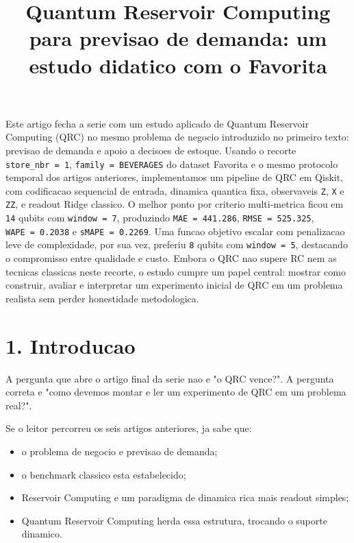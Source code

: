 \documentclass[12pt]{article}
\title{Quantum Reservoir Computing para previsao de demanda: um estudo didatico com o Favorita}
\author{}
\providecommand{\tightlist}{%
  \setlength{\itemsep}{0pt}\setlength{\parskip}{0pt}}
\begin{document}
\maketitle

\begin{resumo}
Este artigo fecha a serie com um estudo aplicado de Quantum Reservoir Computing (QRC) no mesmo problema de negocio introduzido no primeiro texto: previsao de demanda e apoio a decisoes de estoque. Usando o recorte \texttt{store\_nbr\ =\ 1}, \texttt{family\ =\ BEVERAGES} do dataset Favorita e o mesmo protocolo temporal dos artigos anteriores, implementamos um pipeline de QRC em Qiskit, com codificacao sequencial de entrada, dinamica quantica fixa, observaveis \texttt{Z}, \texttt{X} e \texttt{ZZ}, e readout Ridge classico. O melhor ponto por criterio multi-metrica ficou em \texttt{14} qubits com \texttt{window\ =\ 7}, produzindo \texttt{MAE\ =\ 441.286}, \texttt{RMSE\ =\ 525.325}, \texttt{WAPE\ =\ 0.2038} e \texttt{sMAPE\ =\ 0.2269}. Uma funcao objetivo escalar com penalizacao leve de complexidade, por sua vez, preferiu \texttt{8} qubits com \texttt{window\ =\ 5}, destacando o compromisso entre qualidade e custo. Embora o QRC nao supere RC nem as tecnicas classicas neste recorte, o estudo cumpre um papel central: mostrar como construir, avaliar e interpretar um experimento inicial de QRC em um problema realista sem perder honestidade metodologica.
\end{resumo}

\section{1. Introducao}\label{1-introducao}

A pergunta que abre o artigo final da serie nao e "o QRC vence?". A pergunta correta e "como devemos montar e ler um experimento de QRC em um problema real?".

Se o leitor percorreu os seis artigos anteriores, ja sabe que:

\begin{itemize}
\tightlist
\item
  o problema de negocio e previsao de demanda;
\item
  o benchmark classico esta estabelecido;
\item
  Reservoir Computing e um paradigma de dinamica rica mais readout simples;
\item
  Quantum Reservoir Computing herda essa estrutura, trocando o suporte dinamico.
\end{itemize}
\end{document}
